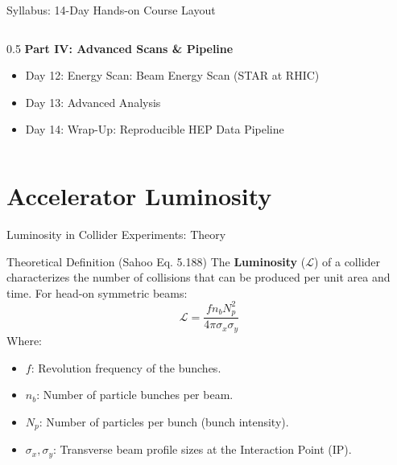 \documentclass[aspectratio=169]{beamer}
\begin{document}
\begin{frame}{Syllabus: 14-Day Hands-on Course Layout}
\begin{columns}
\begin{column}{0.5\textwidth}
            \vspace{0.1cm}
            \textbf{Part IV: Advanced Scans \& Pipeline}
            \begin{itemize}
                \item Day 12: Energy Scan: Beam Energy Scan (STAR at RHIC)
                \item Day 13: Advanced Analysis
                \item Day 14: Wrap-Up: Reproducible HEP Data Pipeline
            \end{itemize}
        \end{column}
    \end{columns}
\end{frame}

\section{Accelerator Luminosity}

\begin{frame}{Luminosity in Collider Experiments: Theory}
    \begin{block}{Theoretical Definition (Sahoo Eq. 5.188)}
        The \textbf{Luminosity} ($\mathcal{L}$) of a collider characterizes the number of collisions that can be produced per unit area and time. For head-on symmetric beams:
        \[ \mathcal{L} = \frac{f n_b N_p^2}{4\pi\sigma_x\sigma_y} \]
        Where:
        \begin{itemize}
            \item $f$: Revolution frequency of the bunches.
            \item $n_b$: Number of particle bunches per beam.
            \item $N_p$: Number of particles per bunch (bunch intensity).
            \item $\sigma_x, \sigma_y$: Transverse beam profile sizes at the Interaction Point (IP).
        \end{itemize}
    \end{block}
\end{frame}
\end{document}
